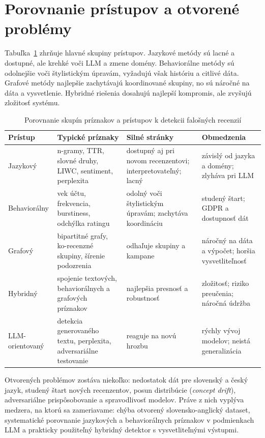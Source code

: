 \documentclass[10pt,twocolumn,twoside,slovak,a4paper]{article}
\begin{document}
\section{Porovnanie prístupov a otvorené problémy} \label{porovnanie}

Tabuľka~\ref{tab:porovnanie} zhrňuje hlavné skupiny prístupov. Jazykové metódy sú lacné a dostupné, ale krehké voči LLM a zmene domény. Behaviorálne metódy sú odolnejšie voči štylistickým úpravám, vyžadujú však históriu a citlivé dáta. Grafové metódy najlepšie zachytávajú koordinované skupiny, no sú náročné na dáta a vysvetlenie. Hybridné riešenia dosahujú najlepší kompromis, ale zvyšujú zložitosť systému.

\begin{table}[!t]
\centering
\caption{Porovnanie skupín príznakov a prístupov k detekcii falošných recenzií}
\label{tab:porovnanie}
\footnotesize
\begin{tabularx}{\textwidth}{@{}p{2.1cm} X X X@{}}
\toprule
Prístup & Typické príznaky & Silné stránky & Obmedzenia \\
\midrule
Jazykový & n-gramy, TTR, slovné druhy, LIWC, sentiment, perplexita & dostupný aj pri novom recenzentovi; interpretovateľný; lacný & závislý od jazyka a domény; zlyháva pri LLM \\
Behaviorálny & vek účtu, frekvencia, burstiness, odchýlka ratingu & odolný voči štylistickým úpravám; zachytáva koordináciu & studený štart; GDPR a dostupnosť dát \\
Grafový & bipartitné grafy, ko-recenzné skupiny, šírenie podozrenia & odhaľuje skupiny a kampane & náročný na dáta a výpočet; horšia vysvetliteľnosť \\
Hybridný & spojenie textových, behaviorálnych a grafových príznakov & najlepšia presnosť a robustnosť & zložitosť; riziko preučenia; náročná údržba \\
LLM-orientovaný & detekcia generovaného textu, perplexita, adversariálne testovanie & reaguje na novú hrozbu & rýchly vývoj modelov; neistá generalizácia \\
\bottomrule
\end{tabularx}
\end{table}

Otvorených problémov zostáva niekoľko: nedostatok dát pre slovenský a český jazyk, studený štart nových recenzentov, posun distribúcie (\emph{concept drift}), adversariálne prispôsobovanie a spravodlivosť modelov. Práve z nich vyplýva medzera, na ktorú sa zameriavame: chýba otvorený slovensko-anglický dataset, systematické porovnanie jazykových a behaviorálnych príznakov v podmienkach LLM a prakticky použiteľný hybridný detektor s vysvetliteľnými výstupmi.
\end{document}
